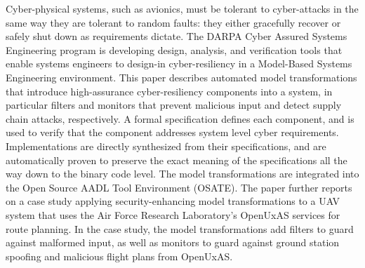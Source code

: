 Cyber-physical systems, such as avionics, must be tolerant to cyber-attacks in the same way they are tolerant to random faults: they either gracefully recover or safely shut down as requirements dictate. The DARPA Cyber Assured Systems Engineering program is developing design, analysis, and verification tools that enable systems engineers to design-in cyber-resiliency in a Model-Based Systems Engineering environment. This paper describes automated model transformations that introduce  high-assurance cyber-resiliency components into a system, in particular filters and monitors that prevent malicious input and detect supply chain attacks, respectively. A formal specification defines each component, and is used to verify that the component addresses system level cyber requirements. Implementations are directly synthesized from their specifications, and are automatically proven to preserve the exact meaning of the specifications all the way down to the binary code level. The model transformations are integrated into the Open Source AADL Tool Environment (OSATE). The paper further reports on a case study applying security-enhancing model transformations to a UAV system that uses the Air Force Research Laboratory's OpenUxAS services for route planning. In the case study, the model transformations add filters to guard against malformed input, as well as monitors to guard against ground station spoofing and malicious flight plans from OpenUxAS.
